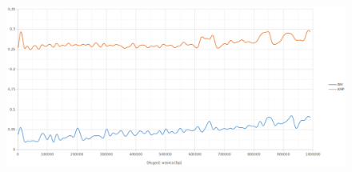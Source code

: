 \begin{figure}[h]
	\centering
	\includegraphics[width=1\textwidth]{img/kmp-vs-bm.png}
	\caption{}
	\label{img:kmp-vs-bm}
\end{figure}